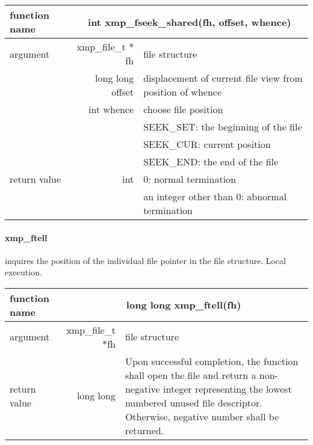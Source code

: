    \begin{table}[h]
    \begin{center}
     \begin{tabular}{|l|r|p{80mm}|}
      \hline
      {\bf function name}  & \multicolumn{2}{c|}{\bf int xmp\_fseek\_shared(fh,
      offset, whence)}  \\ \hline \hline
      argument & xmp\_file\_t $*$fh & file structure \\ \cline{2-3}
      & long long offset & displacement of current file view from
	      position of whence \\ \cline{2-3}
      & int whence & choose file position \\
      &  & SEEK\_SET: the beginning of the file \\ 
      &  & SEEK\_CUR: current position \\ 
      &  & SEEK\_END: the end of the file \\ \hline
      return value & int & 0: normal termination \\
      &  & an integer other than 0: abnormal termination \\ \hline
      \end{tabular}
     \end{center}
    \label{tb:aaa}
   \end{table}

   \paragraph{xmp\_ftell} inquires the position of the individual file pointer in the file structure. Local execution.

   \begin{table}[h]
    \begin{center}
     \begin{tabular}{|l|r|p{80mm}|}
      \hline
      {\bf function name}  & \multicolumn{2}{c|}{\bf long long
      xmp\_ftell(fh)} \\ \hline \hline
      argument & xmp\_file\_t $*$fh & file structure \\ \hline
      return value & long long & Upon successful completion, the
	      function shall open the file and return a non-negative
	      integer representing the lowest numbered unused file
	      descriptor. Otherwise, negative number shall be
	      returned. \\ \hline
      \end{tabular}
     \end{center}
    \label{tb:aaa}
   \end{table}
   
